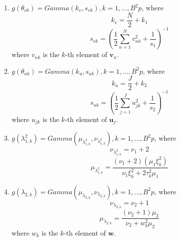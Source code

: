 \documentclass[12pt]{elsarticle}
\begin{document}
\begin{enumerate}
			
			\item $g\left(\theta_{vk}\right)=Gamma(k_{v}, s_{vk}), k=1,...,B^2p$, where
			\[k_{v}=\frac{N}{2}+k_{1}\]
			\[s_{vk} = \left(\frac{1}{2}\sum_{n=1}^{N} {v}_{nk}^{2} + \frac{1}{s_{1}}\right)^{-1}
			\]
			where ${v}_{nk}$ is the $k$-th element of $\boldsymbol{v}_{n}$.
			
			\item $g\left(\theta_{uk}\right)=Gamma(k_{u},s_{uk}), k=1,...,B^2p$, where 
			\[k_{u}=\frac{J}{2}+k_{2}\]
			\[s_{uk}=\left(\frac{1}{2}\sum_{j=1}^{J}{u}_{jk}^{2} + \frac{1}{s_{2}} \right)^{-1}
			\]
			where ${u}_{jk}$ is the $k$-th element of $\boldsymbol{u}_{j}$.
			
			
			\item $g(\lambda_{1,k}^{2}) = Gamma\left(\mu_{\lambda_{1,k}^{2}},\nu_{\lambda_{1,k}^{2}}\right), k=1,...,B^2p$, where
			\[\nu_{\lambda_{1,k}^{2}}=\nu_{1}+2\]
			\[\mu_{\lambda_{1,k}^{2}} = \frac{(\nu_{1}+2)(\mu_{1}\xi_{k}^{2})}{\nu_{1}\xi_{k}^{2}+2\tau_{k}^{2}\mu_{1}}\]
			
			
			
			\item $g(\lambda_{2,k}) = Gamma\left(\mu_{\lambda_{2,k}},\nu_{\lambda_{2,k}}\right), k=1,...,B^{2}p$, where
			\[\nu_{\lambda_{2,k}}=\nu_{2}+1\]
			\[\mu_{\lambda_{2,k}}=\frac{(\nu_{2}+1)\mu_{2}}{\nu_{2}+w_{k}^{2}\mu_{2}}\]
			where $w_{k}$ is the $k$-th element of $\boldsymbol{w}$.
			
			
			

\end{enumerate}
\end{document}
